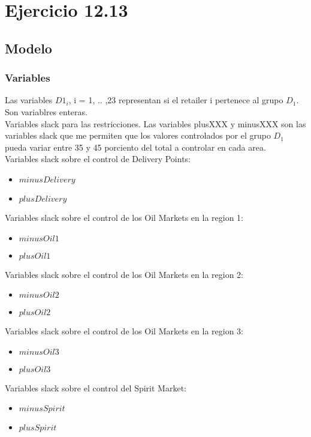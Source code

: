 \section{Ejercicio 12.13}
\subsection{Modelo}
\subsubsection{Variables}
Las variables ${D1}_i$, i = 1, .. ,23 representan si el retailer i pertenece al grupo ${D}_1$. Son variablres enteras. \\
Variables slack para las restricciones. Las variables plusXXX y minusXXX son las variables slack que me permiten que los valores controlados por el grupo $D_1$ pueda variar entre 35 y 45 porciento del total a controlar en cada area. \\
Variables slack sobre el control de Delivery Points:
\begin{itemize}
\item $minusDelivery$ 
\item $plusDelivery$ 
\end{itemize}
Variables slack sobre el control de los Oil Markets en la region 1:
\begin{itemize}
\item $minusOil1$ 
\item $plusOil1$ 
\end{itemize}
Variables slack sobre el control de los Oil Markets en la region 2:
\begin{itemize}
\item $minusOil2$ 
\item $plusOil2$ 
\end{itemize}
Variables slack sobre el control de los Oil Markets en la region 3:
\begin{itemize}
\item $minusOil3$ 
\item $plusOil3$ 
\end{itemize}
Variables slack sobre el control del Spirit Market:
\begin{itemize}
\item $minusSpirit$ 
\item $plusSpirit$ 
\end{itemize}
